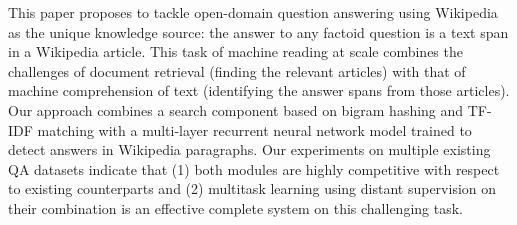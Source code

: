 This paper proposes to tackle open-domain question answering using Wikipedia as the unique knowledge source: the answer to any factoid question is a text span in a Wikipedia article. This task of machine reading at scale combines the challenges of document retrieval (finding the relevant articles) with that of machine comprehension of text (identifying the answer spans from those articles). Our approach combines a search component based on bigram hashing and TF-IDF matching with a multi-layer recurrent neural network model trained to detect answers in Wikipedia paragraphs. Our experiments on multiple existing QA datasets indicate that (1) both modules are highly competitive with respect to existing counterparts and (2) multitask learning using distant supervision on their combination is an effective complete system on this challenging task.
